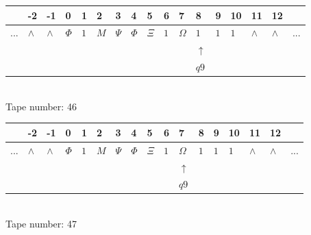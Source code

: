 \documentclass[11pt]{article}
\begin{document}
\begin{table}[H]
\centering
\begin{tabular}{lllllllllllllllll}
 & -2 & -1 & 0 & 1 & 2 & 3 & 4 & 5 & 6 & 7 & 8 & 9 & 10 & 11 & 12 & \\
\hline
$...$ & \multicolumn{1}{|l|}{$\wedge$} & \multicolumn{1}{|l|}{$\wedge$} & \multicolumn{1}{|l|}{$\Phi$} & \multicolumn{1}{|l|}{$1$} & \multicolumn{1}{|l|}{$M$} & \multicolumn{1}{|l|}{$\Psi$} & \multicolumn{1}{|l|}{$\Phi$} & \multicolumn{1}{|l|}{$\Xi$} & \multicolumn{1}{|l|}{$1$} & \multicolumn{1}{|l|}{$\Omega$} & \multicolumn{1}{|l|}{$1$} & \multicolumn{1}{|l|}{$1$} & \multicolumn{1}{|l|}{$1$} & \multicolumn{1}{|l|}{$\wedge$} & \multicolumn{1}{|l|}{$\wedge$} & $...$\\
\hline
&  &  &  &  &  &  &  &  &  &  & $\uparrow$ &  &  &  &  &  \\
&  &  &  &  &  &  &  &  &  &  & $ q9 $ &  &  &  &  &  \\
\end{tabular}
\\
Tape number: 46
\noindent\makebox[\linewidth]{\hdashrule{\textwidth}{1pt}{1pt}}\end{table}

\begin{table}[H]
\centering
\begin{tabular}{lllllllllllllllll}
 & -2 & -1 & 0 & 1 & 2 & 3 & 4 & 5 & 6 & 7 & 8 & 9 & 10 & 11 & 12 & \\
\hline
$...$ & \multicolumn{1}{|l|}{$\wedge$} & \multicolumn{1}{|l|}{$\wedge$} & \multicolumn{1}{|l|}{$\Phi$} & \multicolumn{1}{|l|}{$1$} & \multicolumn{1}{|l|}{$M$} & \multicolumn{1}{|l|}{$\Psi$} & \multicolumn{1}{|l|}{$\Phi$} & \multicolumn{1}{|l|}{$\Xi$} & \multicolumn{1}{|l|}{$1$} & \multicolumn{1}{|l|}{$\Omega$} & \multicolumn{1}{|l|}{$1$} & \multicolumn{1}{|l|}{$1$} & \multicolumn{1}{|l|}{$1$} & \multicolumn{1}{|l|}{$\wedge$} & \multicolumn{1}{|l|}{$\wedge$} & $...$\\
\hline
&  &  &  &  &  &  &  &  &  & $\uparrow$ &  &  &  &  &  &  \\
&  &  &  &  &  &  &  &  &  & $ q9 $ &  &  &  &  &  &  \\
\end{tabular}
\\
Tape number: 47
\noindent\makebox[\linewidth]{\hdashrule{\textwidth}{1pt}{1pt}}\end{table}
\clearpage
\end{document}
